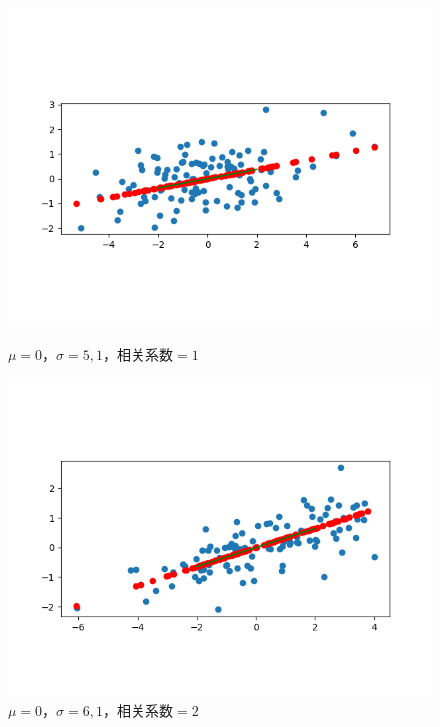 \begin{figure}[htbp]
    \begin{minipage}[t]{0.3\linewidth}
        \centering
        \includegraphics[width=\textwidth]{figures/Figure_1.png}
        \caption{$\mu=0$，$\sigma=5,1$，相关系数$=1$}
        \label{4}
    \end{minipage}
    \begin{minipage}[t]{0.3\linewidth}
        \centering
        \includegraphics[width=\textwidth]{figures/Figure_2.png}
        \caption{$\mu=0$，$\sigma=6,1$，相关系数$=2$}
        \label{5}
    \end{minipage}
    \begin{minipage}[t]{0.3\linewidth}
        \centering

\end{minipage}
\end{figure}
